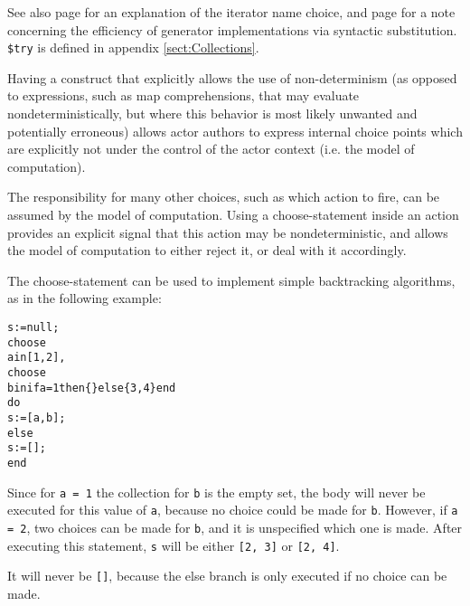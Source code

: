 See also page \pageref{lbl:RationaleIteratorName} for an explanation
of the iterator name choice, and page
\pageref{lbl:GeneratorEfficiency} for a note concerning the efficiency
of generator implementations via syntactic substitution. {\tt \$try}
is defined in appendix \ref{sect:Collections}.

\begin{rationale}
  Having a construct that explicitly allows the use of non-determinism
  (as opposed to expressions, such as map comprehensions, that may
  evaluate nondeterministically, but where this behavior is most
  likely unwanted and potentially erroneous) allows actor authors to
  express internal choice points which are explicitly not under the
  control of the actor context (i.e. the model of computation).
  
  The responsibility for many other choices, such as which action to
  fire, can be assumed by the model of computation. Using a
  choose-statement inside an action provides an explicit signal that
  this action may be nondeterministic, and allows the model of
  computation to either reject it, or deal with it accordingly.
\end{rationale}


\begin{example}
  The choose-statement can be used to implement simple backtracking
  algorithms, as in the following example:
\begin{alltt}  s := null;
  choose 
    a in [1, 2],
  choose 
    b in if a = 1 then \{\} else \{3, 4\} end
  do
    s := [a, b];
  else
    s := [];
  end
\end{alltt}
Since for {\tt a = 1} the collection for {\tt b} is the empty set, the
body will never be executed for this value of {\tt a}, because no
choice could be made for {\tt b}. However, if {\tt a = 2}, two choices
can be made for {\tt b}, and it is unspecified which one is
made. After executing this statement, {\tt s} will be either {\tt [2,
  3]} or {\tt [2, 4]}.

It will never be {\tt []}, because the else branch is only executed if
no choice can be made.
\end{example}











